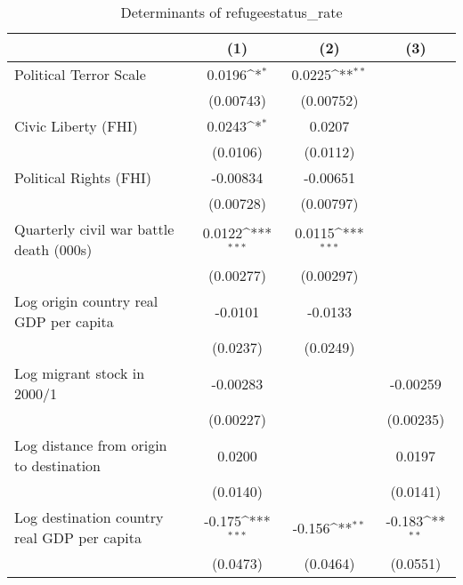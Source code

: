 \begin{table}[htbp]\centering
\def\sym#1{\ifmmode^{#1}\else\(^{#1}\)\fi}
\caption{Determinants of refugeestatus\_rate}
\begin{tabular}{l*{3}{c}}
\hline\hline
                    &\multicolumn{1}{c}{(1)}         &\multicolumn{1}{c}{(2)}         &\multicolumn{1}{c}{(3)}         \\
\hline
Political Terror Scale&      0.0196\sym{*}  &      0.0225\sym{**} &                     \\
                    &   (0.00743)         &   (0.00752)         &                     \\
[1em]
Civic Liberty (FHI) &      0.0243\sym{*}  &      0.0207         &                     \\
                    &    (0.0106)         &    (0.0112)         &                     \\
[1em]
Political Rights (FHI)&    -0.00834         &    -0.00651         &                     \\
                    &   (0.00728)         &   (0.00797)         &                     \\
[1em]
Quarterly civil war battle death (000s)&      0.0122\sym{***}&      0.0115\sym{***}&                     \\
                    &   (0.00277)         &   (0.00297)         &                     \\
[1em]
Log origin country real GDP per capita&     -0.0101         &     -0.0133         &                     \\
                    &    (0.0237)         &    (0.0249)         &                     \\
[1em]
Log migrant stock in 2000/1&    -0.00283         &                     &    -0.00259         \\
                    &   (0.00227)         &                     &   (0.00235)         \\
[1em]
Log distance from origin to destination&      0.0200         &                     &      0.0197         \\
                    &    (0.0140)         &                     &    (0.0141)         \\
[1em]
Log destination country real GDP per capita&      -0.175\sym{***}&      -0.156\sym{**} &      -0.183\sym{**} \\
                    &    (0.0473)         &    (0.0464)         &    (0.0551)         \\

\end{tabular}
\end{table}
